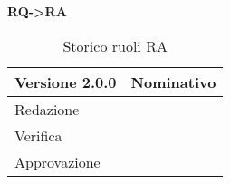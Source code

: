 \noindent \textbf{RQ->RA}
\label{tabVers2}
\begin{table}[h]
	\begin{tabular}{p{} p{}}
		\toprule \textbf{Versione 2.0.0}	&	\textbf{Nominativo}\\
		\midrule Redazione	& \PM\\
		\midrule Verifica & \TP\\
		\midrule Approvazione	& \FM\\
		\bottomrule
	\end{tabular}
	\caption{Storico ruoli RA}
\end{table}

